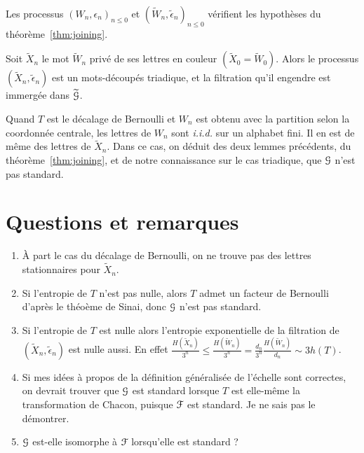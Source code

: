 \documentclass[12pt,a4paper]{article}
\begin{document}
\begin{lemme}
Les processus ${(W_n, \epsilon_n)}_{n \leq 0}$ et 
${(\widetilde{W}_n, \widetilde{\epsilon}_n)}_{n \leq 0}$ 
vérifient les hypothèses du théorème~\ref{thm:joining}. 
\end{lemme}

\begin{lemme}
Soit $\widetilde{X}_n$ le mot $\widetilde{W}_n$ privé de ses lettres en couleur $(\widetilde{X}_0=\widetilde{W}_0)$. 
Alors le processus $(\widetilde{X}_n, \widetilde{\epsilon}_n)$ est un mots-découpés triadique, 
et la filtration qu'il engendre est immergée dans $\widetilde{\EuScript{G}}$.
\end{lemme}

Quand $T$ est le décalage de Bernoulli et $W_n$ est obtenu avec la partition 
selon la coordonnée centrale, les lettres de $W_n$ sont \emph{i.i.d.} sur un alphabet 
fini. Il en est de même des lettres de $\widetilde{X}_n$. 
Dans ce cas, on déduit des deux lemmes précédents, du théorème~\ref{thm:joining}, 
et de notre connaissance sur le cas triadique, que $\EuScript{G}$ n'est pas standard. 

\section{Questions et remarques} 

\begin{enumerate}
\item \`A part le cas du décalage de Bernoulli, on ne trouve pas des lettres 
stationnaires pour $\widetilde{X}_n$. 

\item Si l'entropie de $T$ n'est pas nulle, alors $T$ admet un facteur 
de Bernoulli d'après le théoème de Sinai, donc $\EuScript{G}$ n'est pas standard. 

\item Si l'entropie de $T$ est nulle alors l'entropie exponentielle de la 
filtration de $(\widetilde{X}_n, \widetilde{\epsilon}_n)$ est nulle aussi. 
En effet $\frac{H(\widetilde{X}_n)}{3^n} \leq \frac{H(\widetilde{W}_n)}{3^n} = \frac{d_n}{3^n}\frac{H(\widetilde{W}_n)}{d_n} \sim 3h(T)$.

\item Si mes idées à propos de la définition généralisée de l'échelle sont correctes, 
on devrait trouver que $\EuScript{G}$ est standard lorsque $T$ est elle-même la transformation de 
Chacon, puisque $\EuScript{F}$ est standard. Je ne sais pas le démontrer. 

\item $\EuScript{G}$ est-elle isomorphe à $\EuScript{F}$ lorsqu'elle est standard ? 
\end{enumerate}
\end{document}
